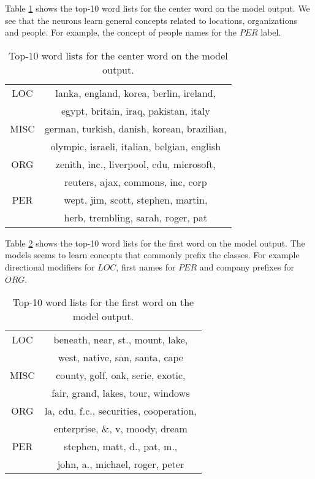 Table \ref{table:1-1b} shows the top-10 word lists for the center word on the model output. We see that the neurons learn general concepts related to locations, organizations and people. For example, the concept of people names for the $PER$ label.

\begin{table}[h]
	\centering
	\begin{tabular}{ |c|c| } 
		\hline
		LOC & lanka, england, korea, berlin, ireland, \\
		& egypt, britain, iraq, pakistan, italy \\
		\hline
		MISC & german, turkish, danish, korean, brazilian, \\
		& olympic, israeli, italian, belgian, english \\
		\hline
		ORG & zenith, inc., liverpool, cdu, microsoft, \\
		& reuters, ajax, commons, inc, corp \\
		\hline
		PER & wept, jim, scott, stephen, martin, \\
		& herb, trembling, sarah, roger, pat \\
		\hline
	\end{tabular}
	\caption{Top-10 word lists for the center word on the model output.}
	\label{table:1-1b}
\end{table}


Table \ref{table:1-1c} shows the top-10 word lists for the first word on the model output. The models seems to learn concepts that commonly prefix the classes. For example directional modifiers for $LOC$, first names for $PER$ and company prefixes for $ORG$.

\begin{table}[h]
	\centering
	\begin{tabular}{ |c|c| } 
		\hline
		LOC & beneath, near, st., mount, lake, \\ 
		& west, native, san, santa, cape \\
		\hline
		MISC & county, golf, oak, serie, exotic, \\ 
		& fair, grand, lakes, tour, windows \\
		\hline
		ORG & la, cdu, f.c., securities, cooperation, \\ 
		& enterprise, \&, v, moody, dream \\
		\hline
		PER & stephen, matt, d., pat, m., \\
		& john, a., michael, roger, peter \\
		\hline
	\end{tabular}
	\caption{Top-10 word lists for the first word on the model output.}
	\label{table:1-1c}
\end{table}



